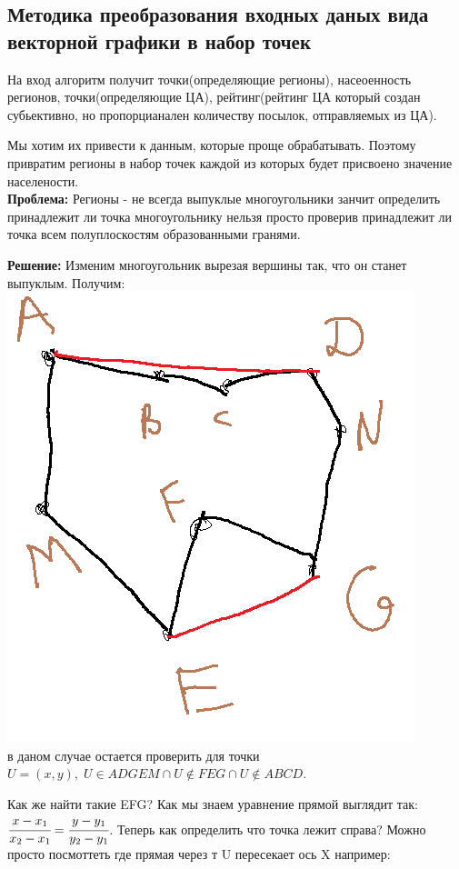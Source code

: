 \documentclass[12pt]{article} %
\begin{document}
 	 \subsection{Методика преобразования входных даных вида векторной графики в набор точек}
 	 \hspace*{1cm}На вход алгоритм получит точки(определяющие регионы), насеоенность регионов, точки(определяющие ЦА), рейтинг(рейтинг ЦА который создан субьективно, но пропорцианален количеству посылок, отправляемых из ЦА).\par
 	 Мы хотим их привести к данным, которые проще обрабатывать. Поэтому привратим регионы в набор точек каждой из которых будет присвоено значение населености.\\
 	 \textbf{Проблема: }Регионы - не всегда выпуклые многоугольники занчит определить принадлежит ли точка многоугольнику нельзя просто проверив принадлежит ли точка всем полуплоскостям образованными гранями. \par
 	 \textbf{Решение: }Изменим многоугольник вырезая вершины так, что он станет выпуклым. Получим: \\
 	 \includegraphics[scale=0.7]{1}\\
 	 в даном случае остается проверить для точки $U = (x, y), \; U \in ADGEM \cap U \notin FEG \cap U \notin ABCD$. \par
 	 Как же найти такие EFG? Как мы знаем уравнение прямой выглядит так: $\cfrac{x-x_1}{x_2 - x_1} = \cfrac{y-y_1}{y_2 -y_1}$. Теперь как определить что точка лежит справа? Можно просто посмоттеть где прямая через т U пересекает ось X например:\\
\end{document}
